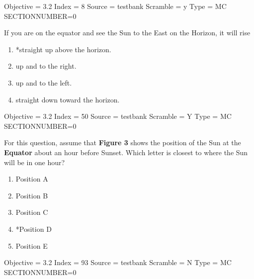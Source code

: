 \documentclass[11pt]{article}
\begin{document}
\begin{enumerate}
\begin{minipage}{\textwidth}
\begin{minipage}{\textwidth}
Objective = 3.2
Index = 8
Source = testbank
Scramble = y
Type = MC
SECTIONNUMBER=0
\end{minipage}
\end{minipage}
\vskip 0.20in

\begin{minipage}{\textwidth}
\begin{minipage}{\textwidth}
\item If you are on the equator and see the Sun to the East on the Horizon, it will rise
\begin{multicols}{2}
\begin{enumerate} 
\setlength{\itemsep}{1pt} 
\setlength{\parskip}{0pt} 
\setlength{\parsep}{0pt}
\setlength{\multicolsep}{1pt} 
\item *straight up above the horizon.
\item up and to the right.
\item up and to the left.
\item straight down toward the horizon.
\end{enumerate} 
\vfill 
\end{multicols}

Objective = 3.2
Index = 50
Source = testbank
Scramble = Y
Type = MC
SECTIONNUMBER=0
\end{minipage}
\end{minipage}
\vskip 0.20in

\begin{minipage}{\textwidth}
\begin{minipage}{\textwidth}
\item For this question, assume that {\bf Figure 3} shows the position of the Sun at the {\bf Equator} about an hour before Sunset.   Which letter is closest to where the Sun will be in one hour?
\begin{multicols}{3}
\begin{enumerate} 
\setlength{\itemsep}{1pt} 
\setlength{\parskip}{0pt} 
\setlength{\parsep}{0pt}
\setlength{\multicolsep}{1pt} 
\item Position A
\item Position B
\item Position C
\item *Position D
\item Position E
\end{enumerate} 
\vfill 
\end{multicols}

Objective = 3.2
Index = 93
Source = testbank
Scramble = N
Type = MC
SECTIONNUMBER=0
\end{minipage}
\end{minipage}
\vskip 0.20in


\end{enumerate}
\end{document}
